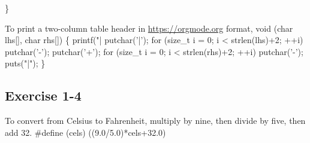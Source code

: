\}
\nwendcode{}\nwdocspar

To print a two-column table header in \href{Org mode}{https://orgmode.org}
format,
\nwenddocs{}\plusendmoddef\nwstartdeflinemarkup{}\nwenddeflinemarkup
void (char lhs[], char rhs[])
\{
    printf("| %
    putchar('|');
    for (size_t i = 0; i < strlen(lhs)+2; ++i)
        putchar('-');
    putchar('+');
    for (size_t i = 0; i < strlen(rhs)+2; ++i)
        putchar('-');
    puts("|");
\}
\nwendcode{}\nwdocspar


\subsection{Exercise 1-4}

To convert from Celsius to Fahrenheit, multiply by nine, then divide by five,
then add 32.
\nwenddocs{}\plusendmoddef\nwstartdeflinemarkup{}\nwenddeflinemarkup
#define (cels) ((9.0/5.0)*cels+32.0)
\nwendcode{}\nwdocspar

